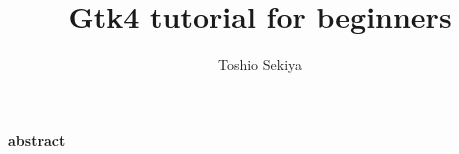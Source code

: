 \documentclass[a4paper]{article}
\title{Gtk4 tutorial for beginners}
\author{Toshio Sekiya}
\date{}
\begin{document}
\maketitle
\begin{center}
\textbf{abstract}
\end{center}

\newpage
\tableofcontents
\newpage
  
  
  
  
  
  
  
  
  
  
  
  
  
  
  
  
  
  
  
  
  
  
  
  
  
  
  
  
  
\newpage
\appendix
  
  
  
\end{document}
